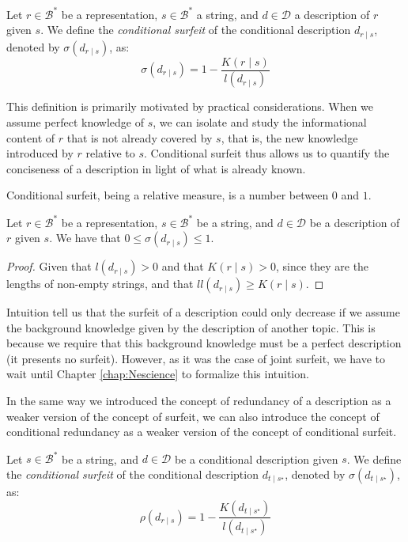 \begin{definition}
Let $r \in \mathcal{B}^\ast$ be a representation, $s \in \mathcal{B}^\ast$ a string, and $d \in \mathcal{D}$ a description of $r$ given $s$. We define the \emph{conditional surfeit} of the conditional description $d_{r \mid s}$, denoted by $\sigma(d_{r \mid s})$, as: 
\[
\sigma(d_{r \mid s}) = 1 - \frac{K\left( r \mid s \right)}{l \left( d_{r \mid s} \right)}
\]
\end{definition}

This definition is primarily motivated by practical considerations. When we assume perfect knowledge of $s$, we can isolate and study the informational content of $r$ that is not already covered by $s$, that is, the new knowledge introduced by $r$ relative to $s$. Conditional surfeit thus allows us to quantify the conciseness of a description in light of what is already known.

Conditional surfeit, being a relative measure, is a number between $0$ and $1$.

\begin{proposition}
Let $r \in \mathcal{B}^\ast$ be a representation, $s \in \mathcal{B}^\ast$ be a string, and $d \in \mathcal{D}$ be a description of $r$ given $s$. We have that $0 \leq \sigma(d_{r \mid s}) \leq 1$.
\end{proposition}
\begin{proof}
Given that $l \left( d_{r \mid s} \right) > 0$ and that $K\left( r \mid s \right) > 0$, since they are the lengths of non-empty strings, and that $ll \left( d_{r \mid s} \right) \geq K\left( r \mid s \right)$.
\end{proof}

Intuition tell us that the surfeit of a description could only decrease if we assume the background knowledge given by the description of another topic. This is because we require that this background knowledge must be a perfect description (it presents no surfeit). However, as it was the case of joint surfeit, we have to wait until Chapter \ref{chap:Nescience} to formalize this intuition.

In the same way we introduced the concept of redundancy of a description as a weaker version of the concept of surfeit, we can also introduce the concept of conditional redundancy as a weaker version of the concept of conditional surfeit.

\begin{definition}
Let $s \in \mathcal{B}^\ast$ be a string, and $d \in \mathcal{D}$ be a conditional description given $s$. We define the \emph{conditional surfeit} of the conditional description $d_{t \mid s^\star}$, denoted by $\sigma(d_{t \mid s^\star})$, as: 
\[
\rho(d_{r \mid s}) = 1 - \frac{K \left( d_{t \mid s^\star} \right)}{l \left( d_{t \mid s^\star} \right)}
\]
\end{definition}

